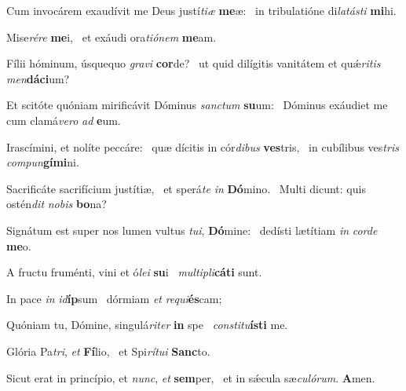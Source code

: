 \item Cum invocárem exaudívit me Deus justí\textit{tiæ} \textbf{me}æ:~\psstar{} in tribulatióne di\textit{latásti} \textbf{mi}hi.
\item Mise\textit{rére} \textbf{me}i,~\psstar{} et exáudi ora\textit{tiónem} \textbf{me}am.
\item Fílii hóminum, úsquequo \textit{gravi} \textbf{cor}de?~\psstar{} ut quid dilígitis vanitátem et quǽ\textit{ritis} \textit{men}\textbf{dá}\textbf{ci}um?
\item Et scitóte quóniam mirificávit Dóminus \textit{sanctum} \textbf{su}um:~\psstar{} Dóminus exáudiet me cum clamá\textit{vero} \textit{ad} \textbf{e}um.
\item Irascímini, et nolíte peccáre:~\pscross{} quæ dícitis in cór\textit{dibus} \textbf{ves}tris,~\psstar{} in cubílibus ves\textit{tris} \textit{compun}\textbf{gí}\textbf{mi}ni.
\item Sacrificáte sacrifícium justítiæ,~\pscross{} et sperá\textit{te} \textit{in} \textbf{Dó}mino.~\psstar{} Multi dicunt: quis ostén\textit{dit} \textit{nobis} \textbf{bo}na?
\item Signátum est super nos lumen vultus \textit{tui}, \textbf{Dó}mine:~\psstar{} dedísti lætítiam \textit{in} \textit{corde} \textbf{me}o.
\item A fructu fruménti, vini et ó\textit{lei} \textbf{su}i~\psstar{} \textit{multipli}\textbf{cá}\textbf{ti} sunt.
\item In pace \textit{in} \textit{id}\textbf{íp}sum~\psstar{} dórmiam \textit{et} \textit{requi}\textbf{és}cam;
\item Quóniam tu, Dómine, singulá\textit{riter} \textbf{in} spe~\psstar{} \textit{constitu}\textbf{ís}\textbf{ti} me.
\item Glória Pa\textit{tri}, \textit{et} \textbf{Fí}lio,~\psstar{} et Spi\textit{rítui} \textbf{Sanc}to.
\item Sicut erat in princípio, et \textit{nunc}, \textit{et} \textbf{sem}per,~\psstar{} et in sǽcula sæ\textit{culórum}. \textbf{A}men.
